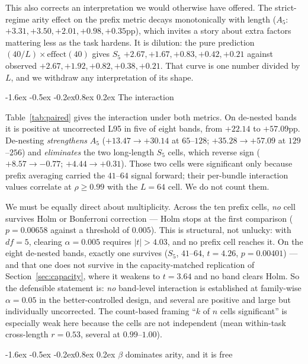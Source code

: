 \documentclass[10pt,twocolumn]{article}
\makeatletter
\renewcommand\subsection{\@startsection{subsection}{2}{\z@}%
  {-1.6ex \@plus -0.5ex \@minus -0.2ex}{0.8ex \@plus 0.2ex}%
  {\normalfont\normalsize\bfseries}}
\makeatother
\begin{document}
This also corrects an interpretation we would otherwise have offered. The
strict-regime arity effect on the prefix metric decays monotonically with length
($A_5$: $+3.31, +3.50, +2.01, +0.98, +0.35$pp), which invites a story about
extra factors mattering less as the task hardens. It is dilution: the pure
prediction $(40/L)\times\text{effect}(40)$ gives $S_5$
$+2.67, +1.67, +0.83, +0.42, +0.21$ against observed
$+2.67, +1.92, +0.82, +0.38, +0.21$. That curve is one number divided by $L$,
and we withdraw any interpretation of its shape.

\subsection{The interaction}

Table~\ref{tab:paired} gives the interaction under both metrics. On de-nested
bands it is positive at uncorrected L95 in five of eight bands, from $+22.14$ to
$+57.09$pp. De-nesting \emph{strengthens} $A_5$ ($+13.47 \to +30.14$ at
$65$--$128$; $+35.28 \to +57.09$ at $129$--$256$) and \emph{eliminates} the two
long-length $S_5$ cells, which reverse sign ($+8.57 \to -0.77$;
$+4.44 \to +0.31$). Those two cells were significant only because prefix
averaging carried the $41$--$64$ signal forward; their per-bundle interaction
values correlate at $\rho \ge 0.99$ with the $L=64$ cell. We do not count them.

We must be equally direct about multiplicity. Across the ten prefix cells,
\emph{no} cell survives Holm or Bonferroni correction --- Holm stops at the
first comparison ($p=0.00658$ against a threshold of $0.005$). This is
structural, not unlucky: with $df=5$, clearing $\alpha=0.005$ requires
$|t|>4.03$, and no prefix cell reaches it. On the eight de-nested bands, exactly
one survives ($S_5$, $41$--$64$, $t=4.26$, $p=0.00401$) --- and that one does not
survive in the capacity-matched replication of Section~\ref{sec:capacity},
where it weakens to $t=3.64$ and no band clears Holm. So the defensible
statement is: \emph{no} band-level interaction is established at family-wise
$\alpha=0.05$ in the better-controlled design, and several are positive and
large but individually uncorrected. The count-based framing ``$k$ of $n$ cells significant'' is
especially weak here because the cells are not independent (mean within-task
cross-length $r=0.53$, several at $0.99$--$1.00$).

\subsection{$\beta$ dominates arity, and it is free}
\label{sec:betavsr}
\end{document}
